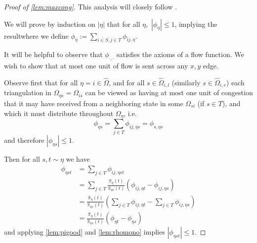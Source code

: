 \documentclass[a4paper, 12p]{article}
\numberwithin{equation}{section}
\newcommand{\Omorproj}{\hat{\Omega}}
\newcommand{\piorproj}{\hat{\pi}}
\begin{document}
\begin{proof}[Proof of \cref{lem:maxcong}]
This analysis will closely follow \cite{eppstein2022improved}.

We will prove by induction on $|\eta|$ that for all $\eta,$ $|\phi_{\eta}| \leq 1$, implying the result\textemdash where we define $\phi_{\eta}:= \sum_{i\in S, j\in T}\phi_{ij,\eta}$.

It will be helpful to observe that $\phi_{\cdot,\cdot}$ satisfies the axioms of a flow function. We wish to show that at most one unit of flow is sent across any $x,y$ edge.

Observe first that for all $\eta = i \in \Omorproj$, and for all $s \in \Omorproj_{i,l}$ (similarly $s \in \Omorproj_{i,r}$) each triangulation  in $\Omega_{\eta s} = \Omega_{is}$ can be viewed as having at most one unit of congestion that it may have received from a neighboring state in some $\Omega_{si}$ (if $s \in T$), and which it must distribute throughout $\Omega_{\eta}$, i.e.
\[
    \phi_{\eta s} = \sum_{j \in T}\phi_{ij,\eta s} = \phi_{s,\eta s} 
\]
and therefore $|\phi_{\eta s}| \leq 1$.

Then for all $s, t \sim \eta$ we have
\begin{align}
    \phi_{\eta s t} &= \sum_{j \in T}\phi_{ij, \eta s t} \\
    &= \sum_{j \in T} \frac{\piorproj_{\eta}(t)}{\piorproj_{\eta s}(t)}(\phi_{ij,\eta t} - \phi_{ij, \eta s})  \\
    &= \frac{\piorproj_{\eta}(t)}{\piorproj_{\eta s}(t)}(\sum_{j \in T}\phi_{ij,\eta t} - \sum_{j \in T} \phi_{ij, \eta s}) \\
    &= \frac{\piorproj_{\eta}(t)}{\piorproj_{\eta s}(t)}(\phi_{\eta t} - \phi_{\eta s})
\end{align}
and applying \cref{lem:pigood} and \cref{lem:rhomono} implies $|\phi_{\eta s t}| \leq 1$.
\end{proof}
\end{document}
